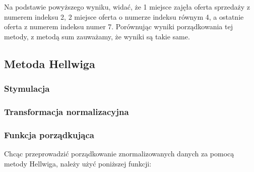 \documentclass[12pt,a4paper]{report}
\begin{document}
{Na podstawie powyższego wyniku, widać, że 1 miejsce zajęła oferta
sprzedaży z numerem indeksu 2, 2 miejsce oferta o numerze indeksu równym 4, a ostatnie oferta z numerem indeksu numer 7. Porównując wyniki porządkowania tej metody, z metodą sum zauważamy, że wyniki są takie same. 

\subsection{Metoda Hellwiga}
\subsubsection{Stymulacja} 
\begin{Shaded}
\begin{Highlighting}[]
\NormalTok{)} 
\end{Highlighting}
\end{Shaded}


\subsubsection{Transformacja normalizacyjna}
\begin{Shaded}
\begin{Highlighting}[]
\end{Highlighting}
\end{Shaded}

\subsubsection{Funkcja porządkująca}\label{funkcja-porzadkujaca-metoda-Hellwiga}

Chcąc przeprowadzić porządkowanie znormalizowanych danych za pomocą metody Hellwiga, należy użyć poniższej funkcji:

}
\end{document}
